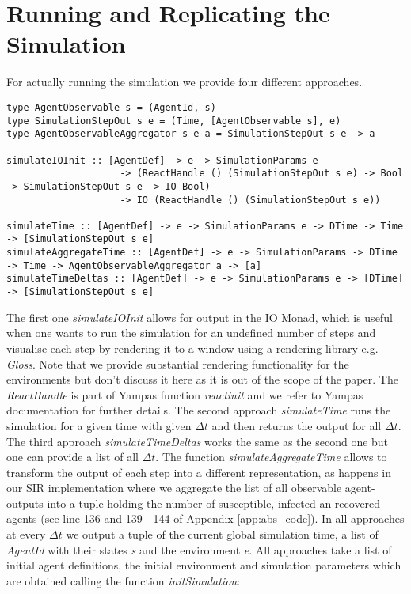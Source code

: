 \section{Running and Replicating the Simulation}
For actually running the simulation we provide four different approaches. 

\begin{verbatim}
type AgentObservable s = (AgentId, s)
type SimulationStepOut s e = (Time, [AgentObservable s], e)
type AgentObservableAggregator s e a = SimulationStepOut s e -> a

simulateIOInit :: [AgentDef] -> e -> SimulationParams e
                    -> (ReactHandle () (SimulationStepOut s e) -> Bool -> SimulationStepOut s e -> IO Bool)
                    -> IO (ReactHandle () (SimulationStepOut s e))
                    
simulateTime :: [AgentDef] -> e -> SimulationParams e -> DTime -> Time -> [SimulationStepOut s e]
simulateAggregateTime :: [AgentDef] -> e -> SimulationParams -> DTime -> Time -> AgentObservableAggregator a -> [a]
simulateTimeDeltas :: [AgentDef] -> e -> SimulationParams e -> [DTime] -> [SimulationStepOut s e]
\end{verbatim}

The first one \textit{simulateIOInit} allows for output in the IO Monad, which is useful when one wants to run the simulation for an undefined number of steps and visualise each step by rendering it to a window using a rendering library e.g. \textit{Gloss}. Note that we provide substantial rendering functionality for the environments but don't discuss it here as it is out of the scope of the paper. The \textit{ReactHandle} is part of Yampas function \textit{reactinit} and we refer to Yampas documentation for further details. The second approach \textit{simulateTime} runs the simulation for a given time with given $\Delta t$ and then returns the output for all $\Delta t$. The third approach \textit{simulateTimeDeltas} works the same as the second one but one can provide a list of all $\Delta t$. The function \textit{simulateAggregateTime} allows to transform the output of each step into a different representation, as happens in our SIR implementation where we aggregate the list of all observable agent-outputs into a tuple holding the number of susceptible, infected an recovered agents (see line 136 and 139 - 144 of Appendix \ref{app:abs_code}).
In all approaches at every $\Delta t$ we output a tuple of the current global simulation time, a list of \textit{AgentId} with their states \textit{s} and the environment \textit{e}. All approaches take a list of initial agent definitions, the initial environment and simulation parameters which are obtained calling the function \textit{initSimulation}:

